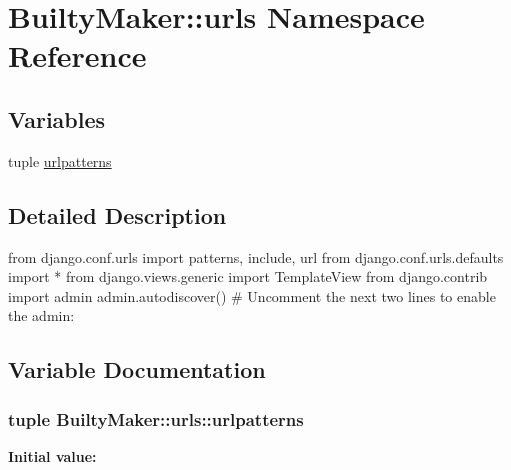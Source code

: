 \hypertarget{namespaceBuiltyMaker_1_1urls}{\section{\-Builty\-Maker\-:\-:urls \-Namespace \-Reference}
\label{namespaceBuiltyMaker_1_1urls}
}
\subsection*{\-Variables}
\begin{DoxyCompactItemize}
\item 
tuple \hyperlink{namespaceBuiltyMaker_1_1urls_a31cc5c7ed2c5d7d3149a703899ad7312}{urlpatterns}
\end{DoxyCompactItemize}


\subsection{\-Detailed \-Description}
\begin{DoxyVerb}from django.conf.urls import patterns, include, url
from django.conf.urls.defaults import *
from django.views.generic import TemplateView
from django.contrib import admin
admin.autodiscover()
# Uncomment the next two lines to enable the admin:
\end{DoxyVerb}
 

\subsection{\-Variable \-Documentation}
\hypertarget{namespaceBuiltyMaker_1_1urls_a31cc5c7ed2c5d7d3149a703899ad7312}{
\subsubsection[{urlpatterns}]{\setlength{\rightskip}{0pt plus 5cm}tuple {\bf \-Builty\-Maker\-::urls\-::urlpatterns}}}\label{namespaceBuiltyMaker_1_1urls_a31cc5c7ed2c5d7d3149a703899ad7312}
{\bfseries \-Initial value\-:}
